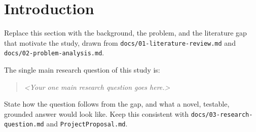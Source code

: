 \section{Introduction}

Replace this section with the background, the problem, and the literature gap
that motivate the study, drawn from \texttt{docs/01-literature-review.md} and
\texttt{docs/02-problem-analysis.md}.

The single main research question of this study is:
\begin{quote}
\emph{<Your one main research question goes here.>}
\end{quote}

State how the question follows from the gap, and what a novel, testable, grounded
answer would look like. Keep this consistent with
\texttt{docs/03-research-question.md} and \texttt{ProjectProposal.md}.
